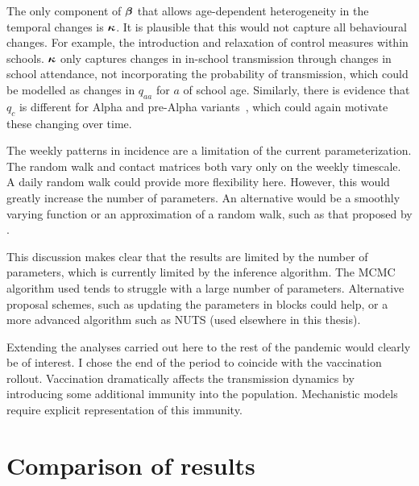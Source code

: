 \documentclass[thesis.tex]{subfiles}
\begin{document}
The only component of $\bm{\beta}$ that allows age-dependent heterogeneity in the temporal changes is $\bm{\kappa}$.
It is plausible that this would not capture all behavioural changes.
For example, the introduction and relaxation of control measures within schools.
$\bm{\kappa}$ only captures changes in in-school transmission through changes in school attendance, not incorporating the probability of transmission, which could be modelled as changes in $q_{aa}$ for $a$ of school age.
Similarly, there is evidence that $q_c$ is different for Alpha and pre-Alpha variants~\autocite{zhuRole}, which could again motivate these changing over time.

The weekly patterns in incidence are a limitation of the current parameterization.
The random walk and contact matrices both vary only on the weekly timescale.
A daily random walk could provide more flexibility here.
However, this would greatly increase the number of parameters.
An alternative would be a smoothly varying function or an approximation of a random walk, such as that proposed by \textcite{ghoshApproximate}.

This discussion makes clear that the results are limited by the number of parameters, which is currently limited by the inference algorithm.
The MCMC algorithm used tends to struggle with a large number of parameters.
Alternative proposal schemes, such as updating the parameters in blocks could help, or a more advanced algorithm such as NUTS (used elsewhere in this thesis).

Extending the analyses carried out here to the rest of the pandemic would clearly be of interest.
I chose the end of the period to coincide with the vaccination rollout.
Vaccination dramatically affects the transmission dynamics by introducing some additional immunity into the population.
Mechanistic models require explicit representation of this immunity.

\section{Comparison of results} \label{transmission:sec:comparison}
\end{document}
